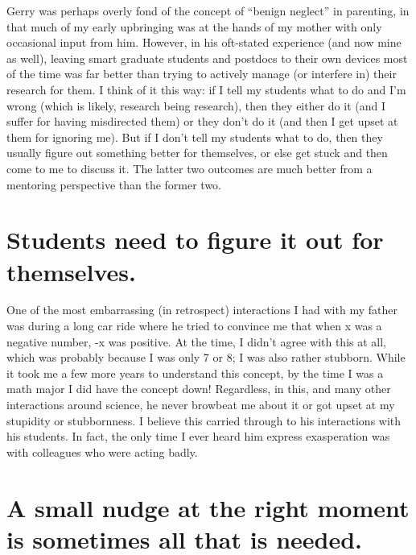 Gerry was perhaps overly fond of the concept of ``benign neglect'' in
parenting, in that much of my early upbringing was at the hands of my
mother with only occasional input from him. However, in his oft-stated
experience (and now mine as well), leaving smart graduate students and
postdocs to their own devices most of the time was far better than
trying to actively manage (or interfere in) their research for them. I
think of it this way: if I tell my students what to do and I'm wrong
(which is likely, research being research), then they either do it
(and I suffer for having misdirected them) or they don't do it (and
then I get upset at them for ignoring me). But if I don't tell my
students what to do, then they usually figure out something better for
themselves, or else get stuck and then come to me to discuss it. The
latter two outcomes are much better from a mentoring perspective than
the former two.

\section*{Students need to figure it out for themselves.}

One of the most embarrassing (in retrospect) interactions I had with
my father was during a long car ride where he tried to convince me
that when x was a negative number, -x was positive. At the time, I
didn't agree with this at all, which was probably because I was only 7
or 8; I was also rather stubborn. While it took me a few more years to
understand this concept, by the time I was a math major I did have the
concept down! Regardless, in this, and many other interactions around science,
he never browbeat me about it or got upset at my stupidity or
stubbornness. I believe this carried through to his interactions with
his students. In fact, the only time I ever heard him express
exasperation was with colleagues who were acting badly.

\section*{A small nudge at the right moment is sometimes all that is needed.}

